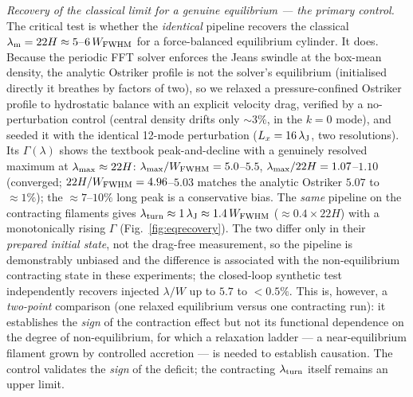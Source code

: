\documentclass[usenatbib,twoside,twocolumn]{mnras}
\begin{document}
\emph{Recovery of the classical limit for a genuine equilibrium --- the primary control.} The critical test is whether the \emph{identical} pipeline recovers the classical $\lambda_{\rm m}=22H\approx5$--$6\,W_{\rm FWHM}$ for a force-balanced equilibrium cylinder. It does. Because the periodic FFT solver enforces the Jeans swindle at the box-mean density, the analytic Ostriker profile is not the solver's equilibrium (initialised directly it breathes by factors of two), so we relaxed a pressure-confined Ostriker profile to hydrostatic balance with an explicit velocity drag, verified by a no-perturbation control (central density drifts only $\sim3\%$, in the $k=0$ mode), and seeded it with the identical 12-mode perturbation ($L_x=16\,\lambda_{\rm J}$, two resolutions). Its $\Gamma(\lambda)$ shows the textbook peak-and-decline with a genuinely resolved maximum at $\lambda_{\rm max}\approx22H$: $\lambda_{\rm max}/W_{\rm FWHM}=5.0$--$5.5$, $\lambda_{\rm max}/22H=1.07$--$1.10$ (converged; $22H/W_{\rm FWHM}=4.96$--$5.03$ matches the analytic Ostriker $5.07$ to $\approx1\%$); the $\approx7$--$10\%$ long peak is a conservative bias. The \emph{same} pipeline on the contracting filaments gives $\lambda_{\rm turn}\approx1\,\lambda_{\rm J}\approx1.4\,W_{\rm FWHM}$ ($\approx0.4\times22H$) with a monotonically rising $\Gamma$ (Fig.~\ref{fig:eqrecovery}). The two differ only in their \emph{prepared initial state}, not the drag-free measurement, so the pipeline is demonstrably unbiased and the difference is associated with the non-equilibrium contracting state in these experiments; the closed-loop synthetic test independently recovers injected $\lambda/W$ up to $5.7$ to $<0.5\%$. This is, however, a \emph{two-point} comparison (one relaxed equilibrium versus one contracting run): it establishes the \emph{sign} of the contraction effect but not its functional dependence on the degree of non-equilibrium, for which a relaxation ladder --- a near-equilibrium filament grown by controlled accretion --- is needed to establish causation. The control validates the \emph{sign} of the deficit; the contracting $\lambda_{\rm turn}$ itself remains an upper limit.
\end{document}
